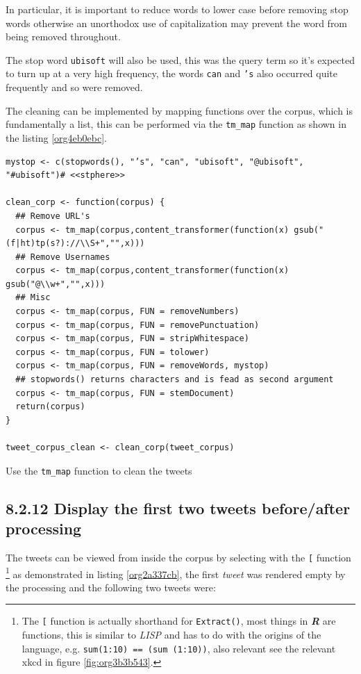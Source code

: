 \documentclass[11pt]{article}
\begin{document}
In particular, it is important to reduce words to lower case before removing stop words otherwise an unorthodox use of capitalization may prevent the word from being removed throughout.

The stop word \texttt{ubisoft} will also be used, this was the query term so it's expected to turn up at a very high frequency, the words \texttt{can} and \texttt{'s} also occurred quite frequently and so were removed.

The cleaning can be implemented by mapping functions over the corpus, which is fundamentally a list, this can be performed via the \texttt{tm\_map} function as shown in the listing \ref{org4eb0ebc}.



\begin{listing}[htbp]
\begin{verbatim}
mystop <- c(stopwords(), "’s", "can", "ubisoft", "@ubisoft", "#ubisoft")# <<stphere>>

clean_corp <- function(corpus) {
  ## Remove URL's
  corpus <- tm_map(corpus,content_transformer(function(x) gsub("(f|ht)tp(s?)://\\S+","",x)))
  ## Remove Usernames
  corpus <- tm_map(corpus,content_transformer(function(x) gsub("@\\w+","",x)))
  ## Misc
  corpus <- tm_map(corpus, FUN = removeNumbers)
  corpus <- tm_map(corpus, FUN = removePunctuation)
  corpus <- tm_map(corpus, FUN = stripWhitespace)
  corpus <- tm_map(corpus, FUN = tolower)
  corpus <- tm_map(corpus, FUN = removeWords, mystop)
  ## stopwords() returns characters and is fead as second argument
  corpus <- tm_map(corpus, FUN = stemDocument)
  return(corpus)
}

tweet_corpus_clean <- clean_corp(tweet_corpus)
\end{verbatim}
\caption{\label{org4eb0ebc}Use the \texttt{tm\_map} function to clean the tweets}
\end{listing}

\subsection{8.2.12 Display the first two tweets before/after processing}
\label{sec:org6db359f}
The tweets can be viewed from inside the corpus by selecting with the \texttt{[} function \footnote{The \texttt{[} function is actually shorthand for \texttt{Extract()}, most things in
\textbf{\emph{R}} are functions, this is similar to \emph{LISP} and has to do with the origins of
the language, e.g. \texttt{sum(1:10) == (sum (1:10))}, also relevant see the relevant
xkcd in figure \ref{fig:org3b3b543}.} as demonstrated in listing \ref{org2a337cb}, the first \emph{tweet} was rendered empty by the processing and the following two tweets were:
\end{document}
